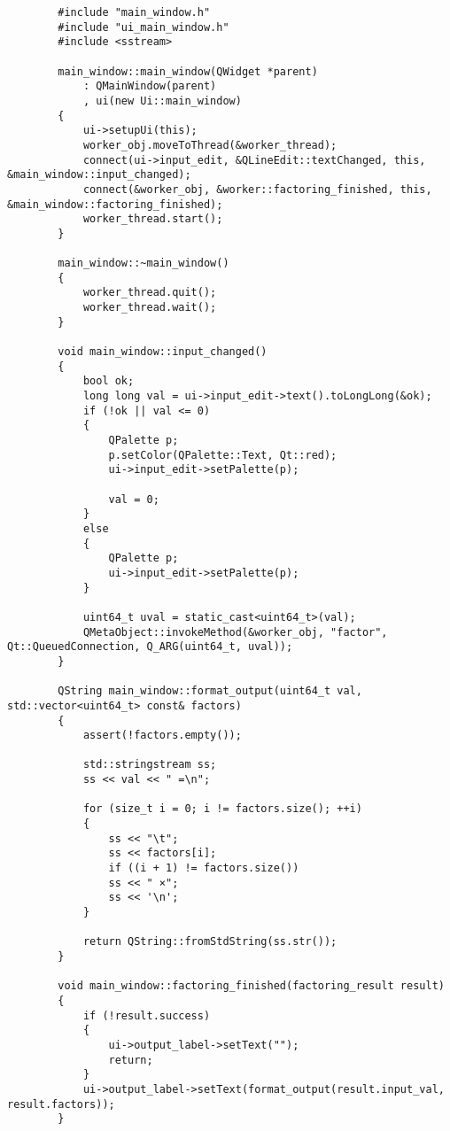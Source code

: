 \documentclass{article}
\begin{document}
    \begin{verbatim}
        #include "main_window.h"
        #include "ui_main_window.h"
        #include <sstream>
        
        main_window::main_window(QWidget *parent)
            : QMainWindow(parent)
            , ui(new Ui::main_window)
        {
            ui->setupUi(this);
            worker_obj.moveToThread(&worker_thread);
            connect(ui->input_edit, &QLineEdit::textChanged, this, &main_window::input_changed);
            connect(&worker_obj, &worker::factoring_finished, this, &main_window::factoring_finished);
            worker_thread.start();
        }
        
        main_window::~main_window()
        {
            worker_thread.quit();
            worker_thread.wait();
        }
        
        void main_window::input_changed()
        {
            bool ok;
            long long val = ui->input_edit->text().toLongLong(&ok);
            if (!ok || val <= 0)
            {
                QPalette p;
                p.setColor(QPalette::Text, Qt::red);
                ui->input_edit->setPalette(p);
                
                val = 0;
            }
            else
            {
                QPalette p;
                ui->input_edit->setPalette(p);
            }
            
            uint64_t uval = static_cast<uint64_t>(val);
            QMetaObject::invokeMethod(&worker_obj, "factor", Qt::QueuedConnection, Q_ARG(uint64_t, uval));
        }
        
        QString main_window::format_output(uint64_t val, std::vector<uint64_t> const& factors)
        {
            assert(!factors.empty());
            
            std::stringstream ss;
            ss << val << " =\n";
            
            for (size_t i = 0; i != factors.size(); ++i)
            {
                ss << "\t";
                ss << factors[i];
                if ((i + 1) != factors.size())
                ss << " ×";
                ss << '\n';
            }
            
            return QString::fromStdString(ss.str());
        }
        
        void main_window::factoring_finished(factoring_result result)
        {
            if (!result.success)
            {
                ui->output_label->setText("");
                return;
            }
            ui->output_label->setText(format_output(result.input_val, result.factors));
        }
    \end{verbatim}
\end{document}
